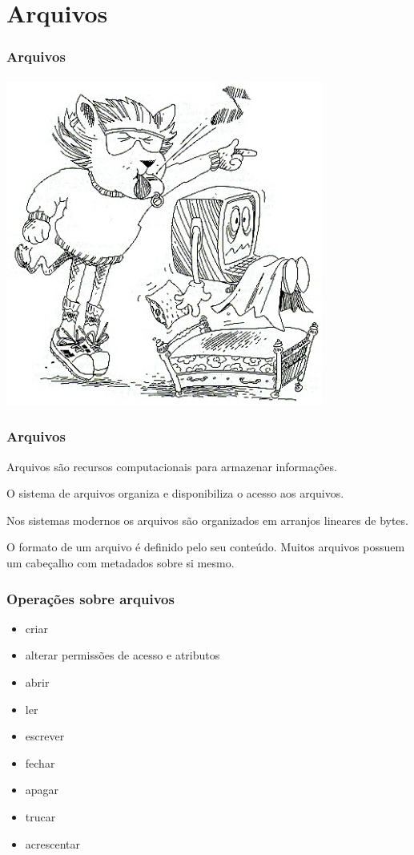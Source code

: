\section{Arquivos}
\begin{frame}
\frametitle{Arquivos}
\framesubtitle{}
\centering
\includegraphics[width=0.4\linewidth,height=0.6\textheight,keepaspectratio]{figures/TexLionWhistle.jpg}
\end{frame}


\begin{frame}
\frametitle{Arquivos}

Arquivos são recursos computacionais para armazenar informações.

\pause 
\vspace{3ex}
O sistema de arquivos organiza e disponibiliza o acesso aos arquivos.

\pause
\vspace{3ex}
Nos sistemas modernos os arquivos são organizados em arranjos lineares de bytes.

\pause
\vspace{3ex}
O formato de um arquivo é definido pelo seu conteúdo. Muitos arquivos possuem um cabeçalho com metadados sobre si mesmo.
\end{frame}

\begin{frame}
\frametitle{Operações sobre arquivos}
\begin{itemize}%
\item criar
\item alterar permissões de acesso e atributos
\item abrir
\item ler
\item escrever
\item fechar
\item apagar
\item trucar
\item acrescentar 
\end{itemize}
\end{frame}


